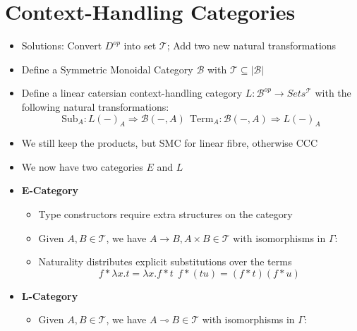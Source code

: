 \documentclass[11pt]{article}
\begin{document}
\section{Context-Handling Categories}
\begin{itemize}
    \item Solutions: Convert $D^{op}$ into set $\mathcal{T}$; Add two new natural transformations
    \item Define a Symmetric Monoidal Category $\mathcal{B}$ with $\mathcal{T} \subseteq |\mathcal{B}|$
    \item Define a linear catersian context-handling category $L: \mathcal{B}^{op} \to Sets^{\mathcal{T}}$ with the following natural transformations:
    \[ \text{Sub}_A : L(-)_A \Rightarrow \mathcal{B}(-, A) \ \ \text{Term}_A: \mathcal{B}(-, A) \Rightarrow L(-)_A\]
    \item We still keep the products, but SMC for linear fibre, otherwise CCC
    \item We now have two categories $E$ and $L$
    \item \textbf{E-Category}
        \begin{itemize}
            \item Type constructors require extra structures on the category
            \item Given $A, B \in \mathcal{T}$, we have $A \to B, A \times B \in \mathcal{T}$
                  with isomorphisms in $\Gamma$:
            \item Naturality distributes explicit substitutions over the terms
                  \[f \ast \lambda x.t = \lambda x.f \ast t \ \ f \ast (tu) = (f \ast t)(f \ast u)\]
        \end{itemize}
    \item \textbf{L-Category}
        \begin{itemize}
            \item Given $A, B \in \mathcal{T}$, we have $A \multimap  B\in \mathcal{T}$
                with isomorphisms in $\Gamma$:
                \begin{mathpar}
                \end{mathpar}

\end{itemize}
\end{itemize}
\end{document}
